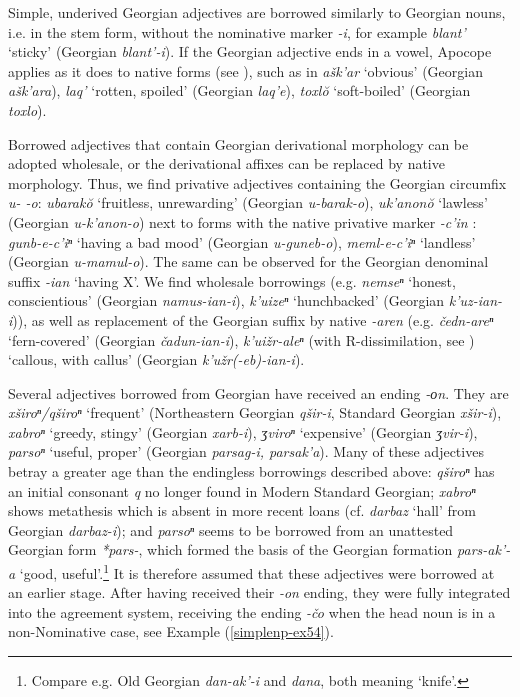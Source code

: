 Simple, underived Georgian adjectives are borrowed similarly to Georgian nouns, i.e. in the stem form, without the nominative marker \textit{-i}, for example \textit{blant'} `sticky' (Georgian \textit{blant'-i}). If the Georgian adjective ends in a vowel, Apocope applies as it does to native forms (see ), such as in \textit{ašk'ar} `obvious' (Georgian \textit{ašk'ara}), \textit{laq'} `rotten, spoiled' (Georgian \textit{laq'e}), \textit{toxl\u{o}} `soft-boiled' (Georgian \textit{toxlo}).



Borrowed adjectives that contain Georgian derivational morphology can be adopted wholesale, or the derivational affixes can be replaced by native morphology. Thus, we find privative adjectives containing the Georgian circumfix \textit{u- -o}: \textit{ubarak\u{o}} `fruitless, unrewarding' (Georgian \textit{u-barak-o}), \textit{uk'anon\u{o}} `lawless' (Georgian \textit{u-k'anon-o}) next to forms with the native privative marker \textit{-c'in} : \textit{gunb-e-c'iⁿ} `having a bad mood' (Georgian \textit{u-guneb-o}), \textit{meml-e-c'iⁿ} `landless' (Georgian \textit{u-mamul-o}). The same can be observed for the Georgian denominal suffix \textit{-ian} `having X'. We find wholesale borrowings (e.g. \textit{nemseⁿ} `honest, conscientious' (Georgian \textit{namus-ian-i}), \textit{k'uizeⁿ} `hunchbacked' (Georgian \textit{k'uz-ian-i})), as well as replacement of the Georgian suffix by native \textit{-aren} (e.g. \textit{čedn-areⁿ} `fern-covered' (Georgian \textit{čadun-ian-i}), \textit{k'uižr-aleⁿ} (with R-dissimilation, see ) `callous, with callus' (Georgian \textit{k'užr(-eb)-ian-i}).

Several adjectives borrowed from Georgian have received an ending \textit{-оn}. They are \textit{xširoⁿ/qširoⁿ} `frequent' (Northeastern Georgian \textit{qšir-i}, Standard Georgian \textit{xšir-i}), \textit{xabroⁿ} `greedy, stingy' (Georgian \textit{xarb-i}), \textit{ʒviroⁿ} `expensive' (Georgian \textit{ʒvir-i}), \textit{parsoⁿ} `useful, proper' (Georgian \textit{parsag-i, parsak'a}). Many of these adjectives betray a greater age than the endingless borrowings described above: \textit{qširoⁿ} has an initial consonant \textit{q} no longer found in Modern Standard Georgian; \textit{xabroⁿ} shows metathesis which is absent in more recent loans (cf. \textit{darbaz} `hall' from Georgian \textit{darbaz-i}); and \textit{parsoⁿ} seems to be borrowed from an unattested Georgian form \textit{*pars-}, which formed the basis of the Georgian formation \textit{pars-ak'-a} `good, useful'.\footnote{Compare e.g. Old Georgian \textit{dan-ak'-i}  and \textit{dana}, both meaning `knife'.} It is therefore assumed that these adjectives were borrowed at an earlier stage. After having received their \textit{-on} ending, they were fully integrated into the agreement system, receiving the ending \textit{-čo} when the head noun is in a non-Nominative case, see Example (\ref{simplenp-ex54}).

